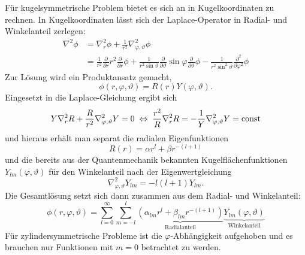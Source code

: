 Für kugelsymmetrische Problem bietet es sich an in Kugelkoordinaten zu rechnen. In Kugelkoordinaten lässt sich der Laplace-Operator in Radial- und Winkelanteil zerlegen:
\begin{align*}
	\nabla ^{2}\phi & =\nabla _{r}^{2}\phi +\frac{1}{r^{2}}\nabla _{\varphi ,\vartheta }^{2}\phi \\&=\frac{1}{r^{2}}\frac{\partial }{\partial r}r^{2}\frac{\partial }{\partial r}\phi +\frac{1}{r^{2}\sin \vartheta }\frac{\partial }{\partial \vartheta }\sin \varphi \frac{\partial }{\partial \vartheta }\phi -\frac{1}{r^{2}\sin ^{2} \vartheta }\frac{\partial ^{2}}{\partial \varphi ^{2}}\phi
\end{align*}
Zur Lösung wird ein Produktansatz gemacht,
\begin{equation*}
	\phi \left(r,\varphi ,\vartheta \right)=R\left(r\right)Y\left(\varphi ,\vartheta \right).
\end{equation*}
Eingesetzt in die Laplace-Gleichung ergibt sich
\begin{equation*}
	Y\nabla _{r}^{2}R+\frac{R}{r^{2}}\nabla _{\varphi ,\vartheta }^{2}Y=0 \;\Leftrightarrow\;\frac{r^{2}}{R}\nabla _{r}^{2}R=-\frac{1}{Y}\nabla _{\varphi ,\vartheta }^{2}Y=\text{const}
\end{equation*}
und hieraus erhält man separat die radialen Eigenfunktionen
\begin{equation*}
	R\left(r\right)=\alpha r^{l}+\beta r^{-\left(l+1\right)}
\end{equation*}
und die bereits aus der Quantenmechanik bekannten Kugelflächenfunktionen $Y_{lm}\left(\varphi ,\vartheta \right)$ für den Winkelanteil nach der Eigenwertgleichung
\begin{equation*}
	\nabla _{\varphi ,\vartheta }^{2}Y_{lm}=-l\left(l+1\right)Y_{lm}.
\end{equation*}
Die Gesamtlösung setzt sich dann zusammen aus dem Radial- und Winkelanteil:
\begin{equation*}
	\phi \left(r,\varphi ,\vartheta \right)=\sum _{l=0}^{\infty }\sum _{m=-l}^{l}\underset{\text{Radialanteil}}{\underbrace{\left(\alpha _{lm}r^{l}+\beta _{lm}r^{-\left(l+1\right)}\right)}}\underset{\text{Winkelanteil}}{\underbrace{Y_{lm}\left(\varphi ,\vartheta \right)}}
\end{equation*}
Für zylindersymmetrische Probleme ist die $\varphi $-Abhängigkeit aufgehoben und es brauchen nur Funktionen mit $m=0$ betrachtet zu werden.

